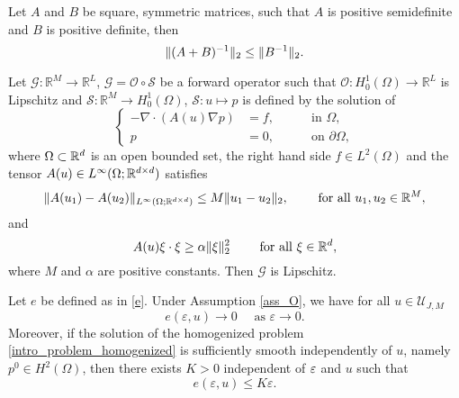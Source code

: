 \begin{lemma} \label{lemma_inverse_sum}
Let $A$ and $B$ be square, symmetric matrices, such that $A$ is positive semidefinite and $B$ is positive definite, then
\[ \lVert(A + B)^{-1}\rVert_2 \le \lVert B^{-1}\rVert_2. \]
\end{lemma}
\begin{lemma} \label{G_lipschitz} Let $\mathcal{G} \colon \mathbb{R}^M \to \mathbb{R}^L$, $\mathcal{G} = \mathcal{O} \circ \mathcal{S}$ be a forward operator such that $\mathcal{O} \colon H^1_0(\Omega) \to \mathbb{R}^L$ is Lipschitz and $\mathcal{S} \colon \mathbb{R}^M \to H^1_0(\Omega)$, $\mathcal S\colon u \mapsto p$ is defined by the solution of
	\begin{equation} \label{problem_lemma}
	\left\{
	\begin{alignedat}{2}
	- \nabla \cdot ( {A(u) \nabla p} ) &= f,  &&\quad \text{ in } \Omega, \\
	p &= 0, &&\quad \text{ on } \partial \Omega,
	\end{alignedat}
	\right.
	\end{equation}
	where $\Omega \subset \mathbb{R}^d$ is an open bounded set, the right hand side $f \in L^2(\Omega)$ and the tensor $A(u) \in L^{\infty}(\Omega; \mathbb{R}^{d \times d})$ satisfies
	\begin{equation}
		 \lVert A(u_1) - A(u_2)\rVert_{L^{\infty}(\Omega; \mathbb{R}^{d \times d})} \le M \lVert u_1 - u_2\rVert_2, \qquad \text{ for all } u_1, u_2 \in \mathbb{R}^M,
	\end{equation}
	and
	\begin{equation}
		A(u) \xi \cdot \xi \ge \alpha \lVert\xi\rVert_2^2 \qquad \text{ for all } \xi \in \mathbb{R}^d,
	\end{equation}
	where $M$ and $\alpha$ are positive constants. Then $\mathcal G$ is Lipschitz.
\end{lemma}

\begin{lemma} \label{f_goes_to_0} Let $e$ be defined as in \eqref{e}. Under Assumption \ref{ass_O}, we have for all $u \in \mathcal U_{J,M}$
\[ e(\varepsilon, u) \to 0 \quad \text{ as } \varepsilon \to 0. \]
Moreover, if the solution of the homogenized problem \eqref{intro_problem_homogenized} is sufficiently smooth independently of $u$, namely $p^0 \in H^2(\Omega)$, then there exists $K > 0$ independent of $\varepsilon$ and $u$ such that
\[ e(\varepsilon, u) \le K \varepsilon. \]
\end{lemma}

